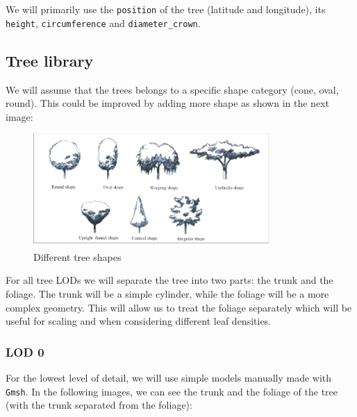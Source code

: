 \documentclass[12pt]{article}
\begin{document}
We will primarily use the \texttt{position} of the tree (latitude and
longitude), its \texttt{height}, \texttt{circumference} and \texttt{diameter\_crown}.

\subsection{Tree library}
We will assume that the trees belongs to a specific shape category (cone, oval, 
round). This could be improved by adding more shape as shown in the next image:
\begin{figure}[H]
    \centering
    \includegraphics[width=0.8\textwidth]{images/Different-types-of-the-trees-shape.png}
    \caption{Different tree shapes\cite{img:tree-shape}}
\end{figure}


For all tree LODs we will separate the tree into two parts: the trunk and the
foliage. The trunk will be a simple cylinder, while the foliage will be a more 
complex geometry. This will allow us to treat the foliage separately which will 
be useful for scaling and when considering different leaf densities.

\subsubsection{LOD 0}
For the lowest level of detail, we will use simple models manually made with 
\texttt{Gmsh}\cite{gmsh}. In the following images, we can see the trunk and the
foliage of the tree (with the trunk separated from the foliage):
\end{document}
